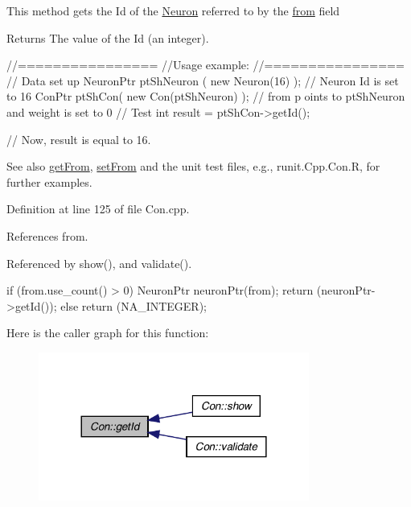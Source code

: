 This method gets the Id of the \hyperlink{class_neuron}{Neuron} referred to by the \hyperlink{class_con_a7c05f90dff56fd26c1fa0f042bba67a6}{from} field \begin{DoxyReturn}{Returns}
The value of the Id (an integer).
\end{DoxyReturn}

\begin{DoxyCode}
        //================
        //Usage example:
        //================
        // Data set up
                        NeuronPtr ptShNeuron ( new Neuron(16) );        // Neuron
       Id is set to 16
                        ConPtr ptShCon( new Con(ptShNeuron) );          // from p
      oints to ptShNeuron and weight is set to 0
        // Test
                        int result = ptShCon->getId();

        // Now, result is equal to 16.
\end{DoxyCode}


\begin{DoxySeeAlso}{See also}
\hyperlink{class_con_a0c126eb4479324b156768e0810723423}{getFrom}, \hyperlink{class_con_a927378392a3ee1fe958b1670cb72e61d}{setFrom} and the unit test files, e.g., runit.Cpp.Con.R, for further examples. 
\end{DoxySeeAlso}


Definition at line 125 of file Con.cpp.



References from.



Referenced by show(), and validate().


\begin{DoxyCode}
{
  if (from.use_count() > 0)
    {
      NeuronPtr neuronPtr(from);
      return (neuronPtr->getId());
    }
  else
    {
      return (NA_INTEGER);
    }
}
\end{DoxyCode}


Here is the caller graph for this function:\nopagebreak
\begin{figure}[H]
\begin{center}
\leavevmode
\includegraphics[width=252pt]{class_con_ad12ce81a557eadb2a00b10d5b5f4adb6_icgraph}
\end{center}
\end{figure}


